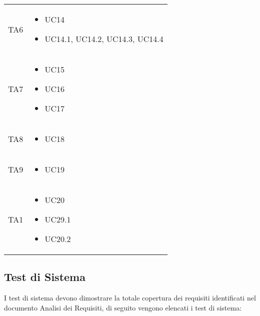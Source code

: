 {\begin{longtable}{C{.3\freewidth} C{.3\freewidth}}
    
    TA6 & \begin{itemize}
        \item UC14
        \item UC14.1, UC14.2, UC14.3, UC14.4
    \end{itemize} \\

    
    TA7 & \begin{itemize}
        \item UC15
        \item UC16
        \item UC17
    \end{itemize} \\

    
    TA8 & \begin{itemize}
        \item UC18
    \end{itemize} \\

    
    TA9 & \begin{itemize}
        \item UC19
    \end{itemize} \\

    TA1 & \begin{itemize}
        \item UC20
        \item UC29.1
        \item UC20.2
    \end{itemize} \\

\bottomrule
\end{longtable}

}

\subsection{Test di Sistema}
I test di sistema devono dimostrare la totale copertura dei requisiti identificati nel documento Analisi dei Requisiti, di seguito vengono elencati i test di sistema:

